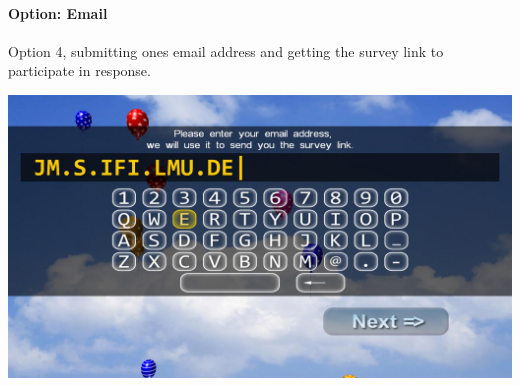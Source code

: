 \clearpage
\paragraph{Option: Email}
\label{screenshot:email-option}
Option 4, submitting ones email address and getting the survey link to participate in response.

\begin{center}
    \includegraphics[width=\columnwidth]{img/screenshots/balloon-game/option-email.jpg}
\end{center}











